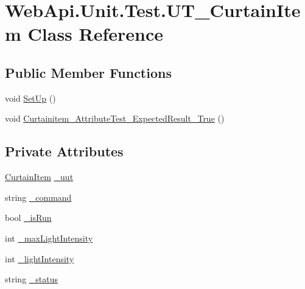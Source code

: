 \hypertarget{class_web_api_1_1_unit_1_1_test_1_1_u_t___curtain_item}{}\section{Web\+Api.\+Unit.\+Test.\+U\+T\+\_\+\+Curtain\+Item Class Reference}
\label{class_web_api_1_1_unit_1_1_test_1_1_u_t___curtain_item}
\subsection*{Public Member Functions}
\begin{DoxyCompactItemize}
\item 
void \mbox{\hyperlink{class_web_api_1_1_unit_1_1_test_1_1_u_t___curtain_item_a30002567d782c22611e1c0bc1ed12333}{Set\+Up}} ()
\item 
void \mbox{\hyperlink{class_web_api_1_1_unit_1_1_test_1_1_u_t___curtain_item_a8368099ad2cdb5d16989655682f62d66}{Curtainitem\+\_\+\+Attribute\+Test\+\_\+\+Expected\+Result\+\_\+\+True}} ()
\end{DoxyCompactItemize}
\subsection*{Private Attributes}
\begin{DoxyCompactItemize}
\item 
\mbox{\hyperlink{class_f_w_p_s_1_1_models_1_1_curtain_item}{Curtain\+Item}} \mbox{\hyperlink{class_web_api_1_1_unit_1_1_test_1_1_u_t___curtain_item_aa1d1e95f506d62a30bb3be63cac96bda}{\+\_\+uut}}
\item 
string \mbox{\hyperlink{class_web_api_1_1_unit_1_1_test_1_1_u_t___curtain_item_af8e14c23311f9f08a5356e3f97d342b8}{\+\_\+command}}
\item 
bool \mbox{\hyperlink{class_web_api_1_1_unit_1_1_test_1_1_u_t___curtain_item_af7672314c3b3492e7c46816a4acaff20}{\+\_\+is\+Run}}
\item 
int \mbox{\hyperlink{class_web_api_1_1_unit_1_1_test_1_1_u_t___curtain_item_a32dbb89f393227b52b6f5eaabf5161d4}{\+\_\+max\+Light\+Intensity}}
\item 
int \mbox{\hyperlink{class_web_api_1_1_unit_1_1_test_1_1_u_t___curtain_item_a6249e6700621e6a4fbfb540b8967eaab}{\+\_\+light\+Intensity}}
\item 
string \mbox{\hyperlink{class_web_api_1_1_unit_1_1_test_1_1_u_t___curtain_item_ac98fc4c58489d58b4b164ebec0be426d}{\+\_\+status}}
\end{DoxyCompactItemize}


